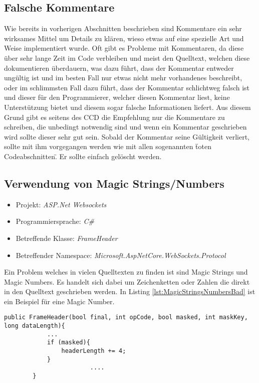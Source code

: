 \subsection{Falsche Kommentare}
\SuperPar Wie bereits in vorherigen Abschnitten beschrieben sind Kommentare ein sehr wirksames Mittel um Details zu klären, wieso etwas auf eine spezielle Art und Weise implementiert wurde. Oft gibt es Probleme mit Kommentaren, da diese über sehr lange Zeit im Code verbleiben und meist den Quelltext, welchen diese dokumentieren überdauern, was dazu führt, dass der Kommentar entweder ungültig ist und im besten Fall nur etwas nicht mehr vorhandenes beschreibt, oder im schlimmsten Fall dazu führt, dass der Kommentar schlichtweg falsch ist und dieser für den Programmierer, welcher diesen Kommentar liest, keine Unterstützung bietet und diesem sogar falsche Informationen liefert. Aus diesem Grund gibt es seitens des CCD die Empfehlung nur die Kommentare zu schreiben, die unbedingt notwendig sind und wenn ein Kommentar geschrieben wird sollte dieser sehr gut sein. Sobald der Kommentar seine Gültigkeit verliert, sollte mit ihm vorgegangen werden wie mit allen sogenannten \"toten Codeabschnitten\". Er sollte einfach gelöscht werden. 

\subsection{Verwendung von Magic Strings/Numbers}
\begin{itemize}
	\item Projekt: \textit{ASP.Net Websockets}
	\item Programmiersprache: \textit{C\#}
	\item Betreffende Klasse: \textit{FrameHeader}
	\item Betreffender Namespace: \textit{Microsoft.AspNetCore.WebSockets.Protocol}
\end{itemize}

\SuperPar Ein Problem welches in vielen Quelltexten zu finden ist sind Magic Strings und Magic Numbers. Es handelt sich dabei um Zeichenketten oder Zahlen die direkt in den Quelltext geschrieben werden. In Listing \ref{lst:MagicStringsNumbersBad} ist ein Beispiel für eine Magic Number.

\begin{lstlisting}[language={[Sharp]C}, caption=MagicNumbers, label=lst:MagicStringsNumbersBad]
        public FrameHeader(bool final, int opCode, bool masked, int maskKey, long dataLength){
           	...
            if (masked){
                headerLength += 4;
            }
						....
        }
\end{lstlisting}

